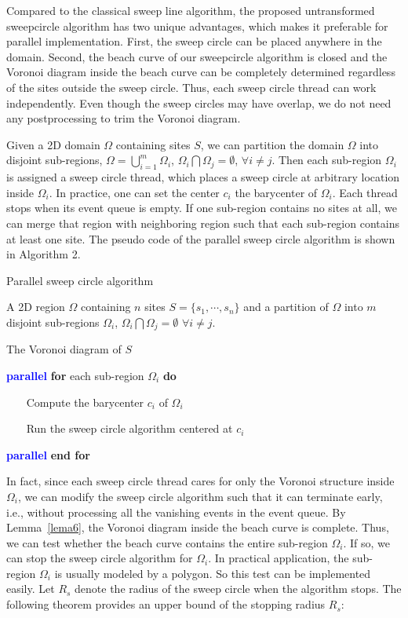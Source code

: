 {{Compared to the classical sweep line algorithm, the proposed untransformed sweepcircle algorithm has two unique advantages, which makes it
preferable for parallel implementation. First, the sweep circle can
be placed anywhere in the domain. Second, the beach curve of our
sweepcircle algorithm is closed and the Voronoi diagram inside the
beach curve can be completely determined regardless of the sites
outside the sweep circle. Thus, each sweep circle thread can work
independently. Even though the sweep circles may have overlap, we
do not need any postprocessing to trim the Voronoi diagram.

Given a 2D domain $\Omega$ containing sites $S$, we can partition
the domain $\Omega$ into disjoint sub-regions, $\Omega=
\bigcup_{i=1}^{m}\Omega_i$, $\Omega_i\bigcap\Omega_j=\emptyset$,
$\forall i\neq j$. Then each sub-region $\Omega_i$ is assigned a
sweep circle thread, which places a sweep circle at arbitrary
location inside $\Omega_i$. In practice, one can set the center
$c_i$ the barycenter of $\Omega_i$. Each thread stops when its event
queue is empty. If one sub-region contains no sites at all, we can
merge that region with neighboring region such that each sub-region
contains at least one site. The pseudo code of the parallel sweep
circle algorithm is shown in Algorithm 2.
\begin{algorithm}[!h]
\label{alg:pseudocode2}  \caption{Parallel sweep circle algorithm}
\begin{algorithmic}
 A 2D region $\Omega$ containing $n$ sites
$S=\{s_1,\cdots,s_n\}$ and a partition of $\Omega$ into $m$ disjoint
sub-regions $\Omega_{i}$, $\Omega_{i}\bigcap \Omega_{j}=\emptyset$
$\forall i\neq j$.

 The Voronoi diagram of $S$

\State \textcolor{blue}{\textbf{parallel}} \textbf{for} each
sub-region $\Omega_i$ \textbf{do}

\State ~~~ Compute the barycenter $c_i$ of $\Omega_i$

\State ~~~ Run the sweep circle algorithm centered at $c_i$

\State \textcolor{blue}{\textbf{parallel}} \textbf{end for}
\end{algorithmic}
\end{algorithm}



In fact, since each sweep circle thread cares for only the Voronoi
structure inside $\Omega_i$, we can modify the sweep circle
algorithm such that it can terminate early, i.e., without processing
all the vanishing events in the event queue.  By Lemma~\ref{lema6},
the Voronoi diagram inside the beach curve is complete. Thus, we can
test whether the beach curve contains the entire sub-region
$\Omega_i$. If so, we can stop the sweep circle algorithm for
$\Omega_i$. In practical application, the sub-region $\Omega_i$ is
usually modeled by a polygon. So this test can be implemented
easily. Let $R_s$ denote the radius of the sweep circle when the
algorithm stops. The following theorem provides an upper bound of the
stopping radius $R_s$:

}}
